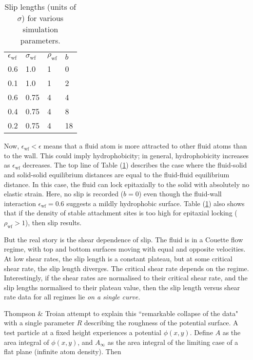 \documentclass[12pt, a4paper, twoside, openright]{book}
\newcommand{\ewf}{\ensuremath{\epsilon_{\mathrm{wf}}}}
\begin{document}
\begin{table}[h]
\centering
\caption{Slip lengths (units of $\sigma$) for various simulation parameters.} \label{tnt}
\begin{tabular}{l l l l}
\ewf & $\sigma_{\mathrm{wf}}$ & $\rho_{\mathrm{wf}}$ & $b$ \\
0.6  & 1.0                    & 1                    & 0 \\
0.1  & 1.0                    & 1                    & 2 \\
0.6  & 0.75                   & 4                    & 4 \\
0.4  & 0.75                   & 4                    & 8 \\
0.2  & 0.75                   & 4                    & 18 \\
\end{tabular}

\end{table}

Now, $\ewf < \epsilon$ means that a fluid atom is more attracted to other fluid atoms than to the wall.  This could imply hydrophobicity; in general, hydrophobicity increases as $\ewf$ decreases. 
The top line of Table (\ref{tnt}) describes the case where the fluid-solid and solid-solid equilibrium distances are equal to the fluid-fluid equilibrium distance.  In this case, the fluid can lock epitaxially to the solid with absolutely no elastic strain.  Here, no slip is recorded ($b=0$) even though the fluid-wall interaction $\ewf=0.6$ suggests a mildly hydrophobic surface.
Table (\ref{tnt}) also shows that if the density of stable attachment sites is too high for epitaxial locking ($\rho_{\mathrm{wf}} > 1$), then slip results.

But the real story is the shear dependence of slip. The fluid is in a Couette flow regime, with top and bottom surfaces moving with equal and opposite velocities.  At low shear rates, the slip length is a constant plateau, but at some critical shear rate, the slip length diverges. %
The critical shear rate depends on the regime.  Interestingly, if the shear rates are normalised to their critical shear rate, and the slip lengths normalised to their plateau value, then the slip length versus shear rate data for all regimes lie \emph{on a single curve.}

Thompson \& Troian attempt to explain this ``remarkable collapse of the data" with a single parameter $R$ describing the roughness of the potential surface. A test particle at a fixed height experiences a potential $\phi(x,y)$. Define $A$ as the area integral of $\phi(x,y)$, and $A_{\infty}$ as the area integral of the limiting case of a flat plane (infinite atom density). Then
\end{document}
